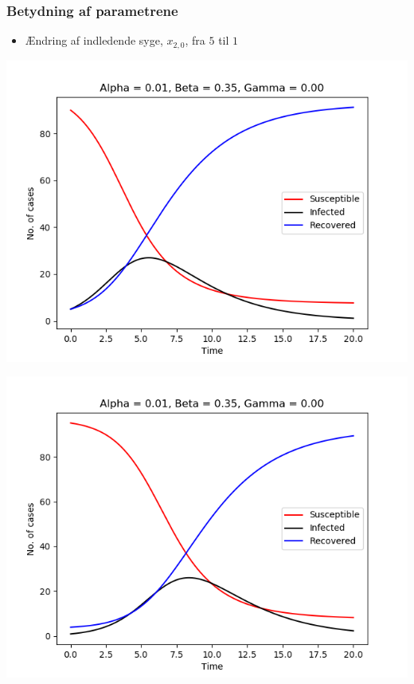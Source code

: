 %
\begin{frame}
\frametitle{Betydning af parametrene}
\begin{itemize}
\item Ændring af indledende syge, $x_{2,0}$, fra $5$ til $1$
\end{itemize}

\begin{minipage}{0.49\textwidth}
\includegraphics[scale=0.3]{fig/img/t_a1_b35_g0.png}
\end{minipage}
%
\begin{minipage}{0.49\textwidth}
\includegraphics[scale=0.3]{fig/img/t_x1_1_x2_95.png}
\end{minipage}
\end{frame}
%

